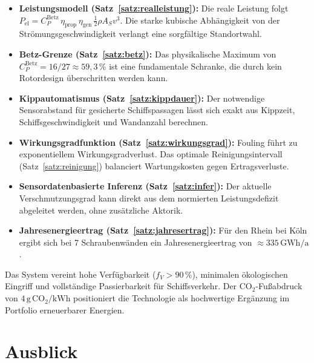 ﻿\documentclass[a4paper,12pt]{article}
\theoremstyle{definition}
\begin{document}
\begin{itemize}
  \item \textbf{Leistungsmodell (Satz~\ref{satz:realleistung}):} Die reale Leistung folgt $P_{\mathrm{el}} = C_P^{\mathrm{Betz}}\,\eta_{\mathrm{prop}}\,\eta_{\mathrm{gen}}\,
        \frac{1}{2}\rho A_S v^3$. Die starke kubische Abhängigkeit von der Strömungsgeschwindigkeit
        verlangt eine sorgfältige Standortwahl.

  \item \textbf{Betz-Grenze (Satz~\ref{satz:betz}):} Das physikalische Maximum von
        $C_P^{\mathrm{Betz}} = 16/27 \approx 59{,}3\,\%$ ist eine fundamentale Schranke,
        die durch kein Rotordesign überschritten werden kann.

  \item \textbf{Kippautomatismus (Satz~\ref{satz:kippdauer}):} Der notwendige
        Sensorabstand für gesicherte Schiffspassagen lässt sich exakt aus Kippzeit,
        Schiffsgeschwindigkeit und Wandanzahl berechnen.

  \item \textbf{Wirkungsgradfunktion (Satz~\ref{satz:wirkungsgrad}):} Fouling führt
        zu exponentiellem Wirkungsgradverlust. Das optimale Reinigungsintervall
        (Satz~\ref{satz:reinigung}) balanciert Wartungskosten gegen Ertragsverluste.

  \item \textbf{Sensordatenbasierte Inferenz (Satz~\ref{satz:infer}):} Der aktuelle
        Verschmutzungsgrad kann direkt aus dem normierten Leistungsdefizit abgeleitet werden,
        ohne zusätzliche Aktorik.

  \item \textbf{Jahresenergieertrag (Satz~\ref{satz:jahresertrag}):} Für den Rhein bei
        Köln ergibt sich bei 7 Schraubenwänden ein Jahresenergieertrag von $\approx 335\,\mathrm{GWh/a}$.
\end{itemize}

Das System vereint hohe Verfügbarkeit ($f_V > 90\,\%$), minimalen ökologischen Eingriff
und vollständige Passierbarkeit für Schiffsverkehr. Der CO$_2$-Fußabdruck von
$4\,\mathrm{g\,CO_2/kWh}$ positioniert die Technologie als hochwertige Ergänzung im
Portfolio erneuerbarer Energien.

\section{Ausblick}
\end{document}

